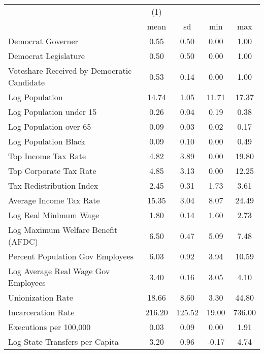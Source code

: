 \begin{tabular}{l*{1}{cccc}} \toprule
                    &\multicolumn{1}{c}{(1)}&            &            &            \\
                    &        mean&          sd&         min&         max\\
\midrule
Democrat Governer   &        0.55&        0.50&        0.00&        1.00\\
Democrat Legislature&        0.50&        0.50&        0.00&        1.00\\
Voteshare Received by Democratic Candidate&        0.53&        0.14&        0.00&        1.00\\
Log Population      &       14.74&        1.05&       11.71&       17.37\\
Log Population under 15&        0.26&        0.04&        0.19&        0.38\\
Log Population over 65&        0.09&        0.03&        0.02&        0.17\\
Log Population Black&        0.09&        0.10&        0.00&        0.49\\
Top Income Tax Rate &        4.82&        3.89&        0.00&       19.80\\
Top Corporate Tax Rate&        4.85&        3.13&        0.00&       12.25\\
Tax Redistribution Index&        2.45&        0.31&        1.73&        3.61\\
Average Income Tax Rate&       15.35&        3.04&        8.07&       24.49\\
Log Real Minimum Wage&        1.80&        0.14&        1.60&        2.73\\
Log Maximum Welfare Benefit (AFDC)&        6.50&        0.47&        5.09&        7.48\\
Percent Population Gov Employees&        6.03&        0.92&        3.94&       10.59\\
Log Average Real Wage Gov Employees&        3.40&        0.16&        3.05&        4.10\\
Unionization Rate   &       18.66&        8.60&        3.30&       44.80\\
Incarceration Rate  &      216.20&      125.52&       19.00&      736.00\\
Executions per 100,000&        0.03&        0.09&        0.00&        1.91\\
Log State Transfers per Capita&        3.20&        0.96&       -0.17&        4.74\\

\end{tabular}
